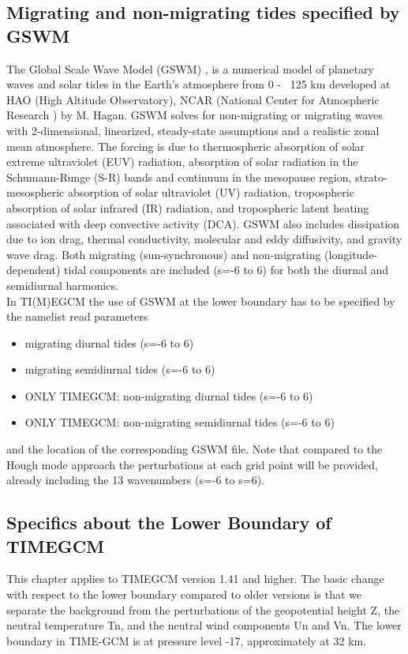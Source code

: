 \subsection{Migrating and non-migrating tides specified by GSWM}
%
The Global Scale Wave Model (GSWM) \cite{Hagan2002},\cite{Hagan2003} is a numerical model 
of planetary waves and 
solar tides in the Earth's atmosphere from 0 - ~125 km developed at 
HAO (High Altitude Observatory), NCAR (National Center for Atmospheric Research ) 
by M. Hagan. GSWM solves for non-migrating or migrating waves with 2-dimensional, 
linearized, steady-state assumptions and a realistic zonal mean atmosphere. 
The forcing is due to thermospheric absorption of solar extreme ultraviolet (EUV) radiation,
absorption of solar radiation in the Schumann-Runge (S-R) bands and continuum in the 
mesopause region, strato-mesospheric absorption of solar ultraviolet (UV) radiation,
tropospheric absorption of solar infrared (IR) radiation, and
tropospheric latent heating associated with deep convective activity (DCA).  
GSWM also includes dissipation due to ion drag, thermal conductivity, molecular and eddy
diffusivity, and gravity wave drag.
Both migrating (sun-synchronous) and non-migrating 
(longitude-dependent) tidal components are included (s=-6 to 6) for both the diurnal and semidiurnal
harmonics.  \\
%
In TI(M)EGCM the use of GSWM at the lower boundary has to be specified by the namelist read
parameters
%
\begin{itemize}
  \item migrating diurnal tides (s=-6 to 6) 
  \item migrating semidiurnal tides (s=-6 to 6) 
  \item ONLY TIMEGCM: non-migrating diurnal tides (s=-6 to 6) \\ 
  \item ONLY TIMEGCM: non-migrating semidiurnal tides (s=-6 to 6) \\ 
\end{itemize} 
%
and the location of the corresponding GSWM file. Note that compared to the Hough mode approach the
perturbations at each grid point will be provided, already including the 13 wavenumbers (s=-6 to
s=6).
\subsection{Specifics about the Lower Boundary of TIMEGCM}
%
This chapter applies to TIMEGCM version 1.41 and higher. The basic change with
respect to the lower boundary compared to older versions is that we separate the
background from the perturbations of the geopotential height Z, the neutral
temperature Tn, and the neutral wind components Un and Vn. The lower boundary in
TIME-GCM is at pressure level -17, approximately at 32 km.
%
